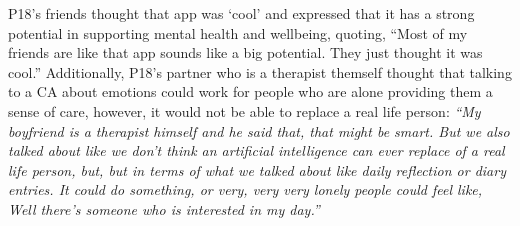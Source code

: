         P18's friends thought that \acl{app} was `cool' and expressed that it has a strong potential in supporting mental health and wellbeing, quoting, ``Most of my friends are like that \acl{app} sounds like a big potential. They just thought it was cool.''
        Additionally, P18's partner who is a therapist themself thought that talking to a \ac{CA} about emotions could work for people who are alone providing them a sense of care, however, it would not be able to replace a real life person:
            \textit{
            ``My boyfriend is a therapist himself and he said that, that might be smart. But we also talked about like we don't think an artificial intelligence can ever replace of a real life person, but, but in terms of what we talked about like daily reflection or diary entries. It could do something, or very, very very lonely people 
            could feel like, Well there's someone who is interested in my day.''
            }
        

